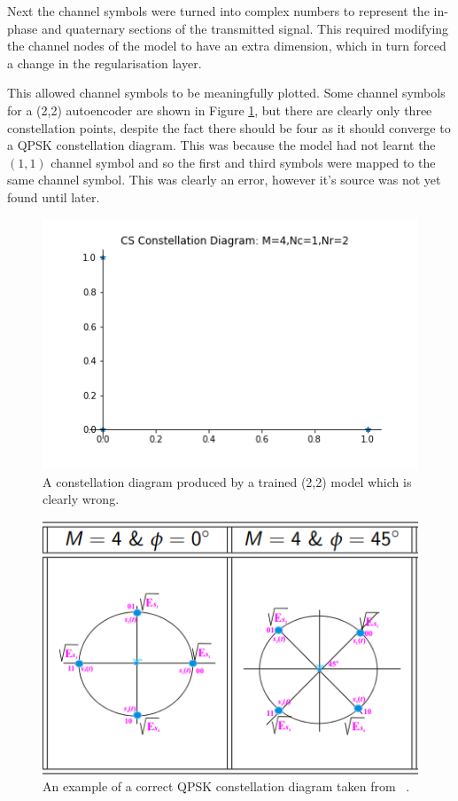 \documentclass[12pt,onecolumn,letterpaper]{article}
\newcommand\genfigsize{0.5}
\begin{document}
Next the channel symbols were turned into complex numbers to represent the in-phase and quaternary sections of the transmitted signal. This required modifying the channel nodes of the model to have an extra dimension, which in turn forced a change in the regularisation layer.

This allowed channel symbols to be meaningfully plotted. Some channel symbols for a (2,2) autoencoder are shown in Figure \ref{fig:WrongConstellationDiagram}, but there are clearly only three constellation points, despite the fact there should be four as it should converge to a QPSK constellation diagram. This was because the model had not learnt the $(1,1)$ channel symbol and so the first and third symbols were mapped to the same channel symbol. This was clearly an error, however it's source was not yet found until later. 

\begin{figure}[t]
   \centering
   \includegraphics[width=\genfigsize\linewidth]{figures/wrong_constellation_diagram.png}
   \caption{A constellation diagram produced by a trained (2,2) model which is clearly wrong. }
\label{fig:WrongConstellationDiagram}
\end{figure}

\begin{figure}[t]
   \centering
   \includegraphics[width=\genfigsize\linewidth]{figures/EE3-03_comms_systems_qpsk_constellation_diagram.PNG}
   \caption{An example of a correct QPSK constellation diagram taken from ~\cite{EE3CommsSystemsNotesL4}. }
\label{fig:CommsSystemsConstelDiagEg}
\end{figure}
\end{document}
